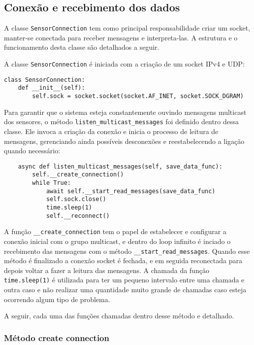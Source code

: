 \subsection[Conexão e recebimento dos dados]{Conexão e recebimento dos dados}\label{subsec:Conexão e recebimento dos dados}

A classe \texttt{SensorConnection} tem como principal responsabilidade criar um socket, manter-se conectada para receber mensagens e interpreta-las. A estrutura e o funcionamento desta classe são detalhados a seguir.

A classe \texttt{SensorConnection} é iniciada com a criação de um socket IPv4 e UDP:

\begin{verbatim}
class SensorConnection:
    def __init__(self):
        self.sock = socket.socket(socket.AF_INET, socket.SOCK_DGRAM)
\end{verbatim}

Para garantir que o sistema esteja constantemente ouvindo mensagens multicast dos sensores, o método \texttt{listen\_multicast\_messages} foi definido dentro dessa classe. Ele invoca a criação da conexão e inicia o processo de leitura de mensagens, gerenciando ainda possíveis desconexões e reestabelecendo a ligação quando necessário:

\begin{verbatim}
    async def listen_multicast_messages(self, save_data_func):
        self.__create_connection()
        while True:
            await self.__start_read_messages(save_data_func)
            self.sock.close()
            time.sleep(1)
            self.__reconnect()
\end{verbatim}

A função \texttt{\_\_create\_connection} tem o papel de estabelecer e configurar a conexão inicial com o grupo multicast, e dentro do loop infinito é inciado o recebimento das mensagens com o método \texttt{\_\_start\_read\_messages}. Quando esse método é finalizado a conexão socket é fechada, e em seguida reconectada para depois voltar a fazer a leitura das mensagens. A chamada da função \texttt{time.sleep(1)} é utilizada para ter um pequeno intervalo entre uma chamada e outra caso e não realizar uma quantidade muito grande de chamadas caso esteja ocorrendo algum tipo de problema.

A seguir, cada uma das funções chamadas dentro desse método e detalhado.


\subsubsection[Método create connection]{Método create connection}

